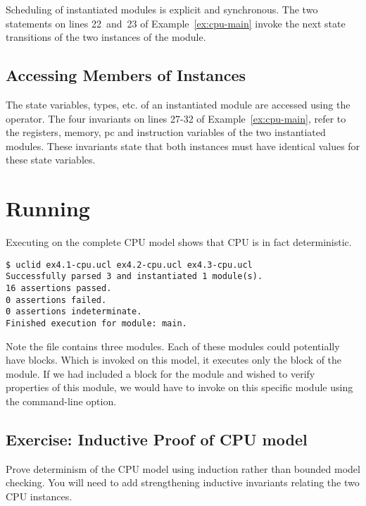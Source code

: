 Scheduling of instantiated modules is explicit and synchronous. The two  statements on lines 22~and~23 of Example~\ref{ex:cpu-main} invoke the next state transitions of the two instances of the  module.

\subsection{Accessing Members of Instances}

The state variables, types, etc. of an instantiated module are accessed using the  operator. The four invariants on lines 27-32 of Example~\ref{ex:cpu-main}, refer to the registers, memory, pc and instruction variables of the two instantiated modules. These invariants state that both instances must have identical values for these state variables.


\section{Running \uclid{}}

Executing \uclid{} on the complete CPU model shows that CPU is in fact deterministic. 

\begin{Verbatim}[frame=single, samepage=true]
$ uclid ex4.1-cpu.ucl ex4.2-cpu.ucl ex4.3-cpu.ucl 
Successfully parsed 3 and instantiated 1 module(s).
16 assertions passed.
0 assertions failed.
0 assertions indeterminate.
Finished execution for module: main.
\end{Verbatim}

Note the file  contains three modules. Each of these modules could potentially have  blocks. Which \uclid{} is invoked on this model, it executes only the  block of the  module.  If we had included a  block for the  module and wished to verify properties of this module, we would have to invoke \uclid{} on this specific module using the  command-line option.

\subsection{Exercise: Inductive Proof of CPU model}
Prove determinism of the CPU model using induction rather than bounded model checking. You will need to add strengthening inductive invariants relating the two CPU instances.
